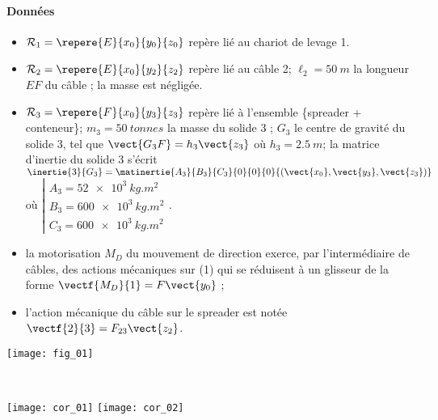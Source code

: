 \begin{multicols}{2}
\paragraph*{Données}
\begin{itemize}
\item $\mathcal{R}_1=\repere{E}{x_0}{y_0}{z_0}$  repère lié au chariot de levage 1.
\item $\mathcal{R}_2=\repere{E}{x_0}{y_2}{z_2}$  repère lié au câble 2; $\ell_2 = \SI{50}{m}$ la longueur $EF$
du câble ; la masse est négligée.
\item $\mathcal{R}_3=\repere{F}{x_0}{y_3}{z_3}$  repère lié à l’ensemble \{spreader + conteneur\};
$m_3 = \SI{50}{tonnes}$ la masse du solide 3 ; $G_3$ le centre de gravité du
solide 3, tel que $\vect{G_3F}=h_3\vect{z_3}$ où $h_3 = \SI{2,5}{m}$; la matrice d’inertie du solide 3 s’écrit
$\inertie{3}{G_3}=\matinertie{A_3}{B_3}{C_3}{0}{0}{0}{\left(\vect{x_0},\vect{y_3},\vect{z_3} \right)}$ où $\left| \begin{array}{l} A_3 = \SI{52e3}{kg.m^2} \\ B_3 = \SI{600e3}{kg.m^2} \\ C_3 = \SI{600e3}{kg.m^2} \end{array}\right.$. 
\item la motorisation $M_D$ du mouvement de direction exerce, par l’intermédiaire de câbles, des actions mécaniques sur (1) qui se réduisent
à un glisseur de la forme $\vectf{M_D}{1} =F \vect{y_0}$ ;
\item l’action mécanique du câble sur le spreader est notée $\vectf{2}{3} =F_{23} \vect{z_2}$.
\end{itemize}



\begin{center}
\texttt{[image: fig\_01]}
\end{center}

\fi

\ifprof
\begin{corrige} ~\\

\begin{center}
\texttt{[image: cor\_01]}
\hfill
\texttt{[image: cor\_02]}
\end{center}


\end{corrige}
\end{multicols}
